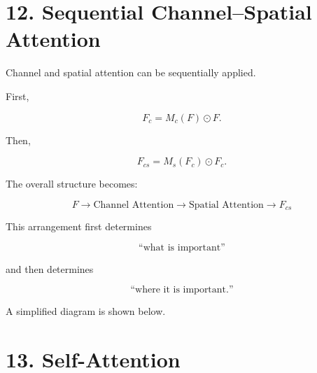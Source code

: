 \documentclass[10pt]{article}
\begin{document}
\section*{12. Sequential Channel--Spatial Attention}

Channel and spatial attention can be sequentially applied.

First,

\[
F_c
=
M_c(F)\odot F.
\]

Then,

\[
F_{cs}
=
M_s(F_c)\odot F_c.
\]

The overall structure becomes:

\[
\boxed{
F
\rightarrow
\text{Channel Attention}
\rightarrow
\text{Spatial Attention}
\rightarrow
F_{cs}
}
\]

This arrangement first determines

\[
\text{``what is important''}
\]

and then determines

\[
\text{``where it is important.''}
\]

A simplified diagram is shown below.

\begin{center}


\end{center}

\section*{13. Self-Attention}
\end{document}
